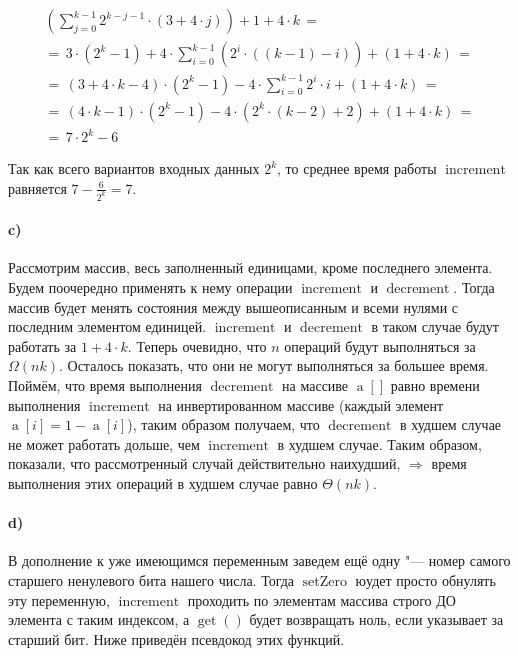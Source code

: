 	\begin{gather*}
	\left(\sum_{j = 0}^{k-1} 2^{k-j-1} \cdot (3 + 4\cdot j)\right) + 1+4\cdot k \,=\\
	=\, 3 \cdot (2^k - 1) + 4\cdot \sum_{i = 0}^{k-1} (2^{i} \cdot ((k-1)-i)) + (1 + 4\cdot k) \,=\\
	=\, (3 + 4\cdot k - 4) \cdot(2^k - 1) - 4\cdot \sum_{i = 0}^{k-1}  2^i\cdot i +  (1 + 4\cdot k) \,=\\
	=\, (4\cdot k - 1) \cdot(2^k - 1) - 4\cdot(2^k\cdot(k-2) + 2) + (1+4\cdot k) \,=\\
	=\, 7\cdot 2^k - 6
	\end{gather*}
	
	Так как всего вариантов входных данных $2^k$, то среднее время работы $\operatorname{increment}$ равняется $7 - \frac{6}{2^k} = 7$.
	
	\paragraph{c)}
	
	Рассмотрим массив, весь заполненный единицами, кроме последнего элемента. Будем поочередно применять к нему операции $\operatorname{increment}$ и $\operatorname{decrement}$. Тогда массив будет менять состояния между вышеописанным и всеми нулями с последним элементом единицей. $\operatorname{increment}$ и $\operatorname{decrement}$ в таком случае будут работать за $1 + 4\cdot k$. Теперь очевидно, что $n$ операций будут выполняться за $\Omega(nk)$. Осталось показать, что они не могут выполняться за большее время. Поймём, что время выполнения $\operatorname{decrement}$ на массиве $\operatorname{a}[]$ равно времени выполнения $\operatorname{increment}$ на инвертированном массиве (каждый элемент $\operatorname{a}[i] = 1 - \operatorname{a}[i]$), таким образом получаем, что $\operatorname{decrement}$ в худшем случае не может работать дольше, чем $\operatorname{increment}$ в худшем случае. Таким образом, показали, что рассмотренный случай действительно наихудший, $\Rightarrow$ время выполнения этих операций в худшем случае равно $\Theta(nk)$.
	
	\paragraph{d)}
	
	В дополнение к уже имеющимся переменным заведем ещё одну "--- номер самого старшего ненулевого бита нашего числа. Тогда $\operatorname{setZero}$ юудет просто обнулять эту переменную, $\operatorname{increment}$ проходить по элементам массива строго ДО элемента с таким индексом, а $\operatorname{get}()$ будет возвращать ноль, если указывает за старший бит. Ниже приведён псевдокод этих функций.
	
